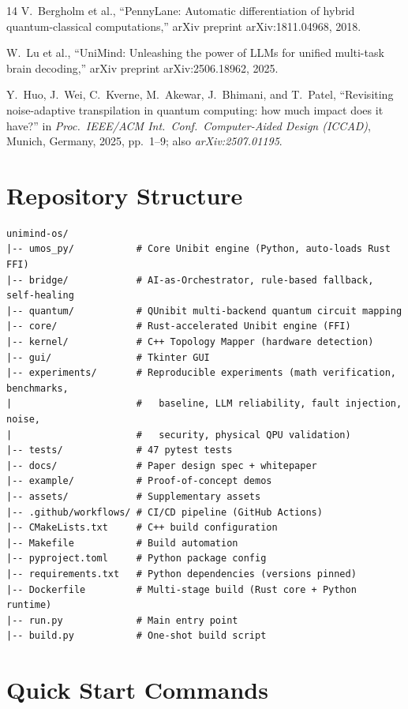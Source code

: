 ﻿\documentclass[12pt,a4paper]{article}
\begin{document}
\begin{thebibliography}{14}
V.~Bergholm et al.,
``PennyLane: Automatic differentiation of hybrid quantum-classical computations,''
arXiv preprint arXiv:1811.04968, 2018.

W.~Lu et al.,
``UniMind: Unleashing the power of LLMs for unified multi-task brain decoding,''
arXiv preprint arXiv:2506.18962, 2025.

Y.~Huo, J.~Wei, C.~Kverne, M.~Akewar, J.~Bhimani, and T.~Patel,
``Revisiting noise-adaptive transpilation in quantum computing: how much impact does it have?''
in \textit{Proc.\ IEEE/ACM Int.\ Conf.\ Computer-Aided Design (ICCAD)},
Munich, Germany, 2025, pp.~1--9; also \emph{arXiv:2507.01195}.

\end{thebibliography}


\newpage
\appendix

\section{Repository Structure}

\begingroup
\footnotesize
\begin{verbatim}
unimind-os/
|-- umos_py/           # Core Unibit engine (Python, auto-loads Rust FFI)
|-- bridge/            # AI-as-Orchestrator, rule-based fallback, self-healing
|-- quantum/           # QUnibit multi-backend quantum circuit mapping
|-- core/              # Rust-accelerated Unibit engine (FFI)
|-- kernel/            # C++ Topology Mapper (hardware detection)
|-- gui/               # Tkinter GUI
|-- experiments/       # Reproducible experiments (math verification, benchmarks,
|                      #   baseline, LLM reliability, fault injection, noise,
|                      #   security, physical QPU validation)
|-- tests/             # 47 pytest tests
|-- docs/              # Paper design spec + whitepaper
|-- example/           # Proof-of-concept demos
|-- assets/            # Supplementary assets
|-- .github/workflows/ # CI/CD pipeline (GitHub Actions)
|-- CMakeLists.txt     # C++ build configuration
|-- Makefile           # Build automation
|-- pyproject.toml     # Python package config
|-- requirements.txt   # Python dependencies (versions pinned)
|-- Dockerfile         # Multi-stage build (Rust core + Python runtime)
|-- run.py             # Main entry point
|-- build.py           # One-shot build script
\end{verbatim}
\endgroup

\section{Quick Start Commands}
\end{document}
